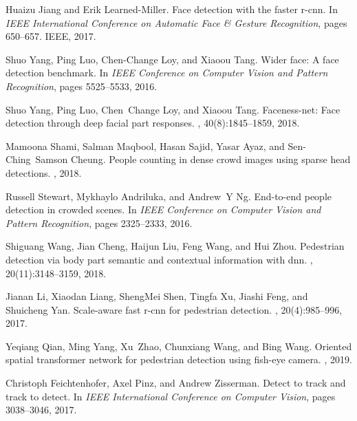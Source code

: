 \documentclass[journal]{IEEEtran}
\begin{document}
\begin{thebibliography}{10}
	
	Huaizu Jiang and Erik Learned-Miller.
	\newblock Face detection with the faster r-cnn.
	\newblock In {\em IEEE International Conference on Automatic Face \& Gesture
		Recognition}, pages 650--657. IEEE, 2017.
	
	Shuo Yang, Ping Luo, Chen-Change Loy, and Xiaoou Tang.
	\newblock Wider face: A face detection benchmark.
	\newblock In {\em IEEE Conference on Computer Vision and Pattern Recognition},
	pages 5525--5533, 2016.
	
	Shuo Yang, Ping Luo, Chen~Change Loy, and Xiaoou Tang.
	\newblock Faceness-net: Face detection through deep facial part responses.
	,
	40(8):1845--1859, 2018.
	
	Mamoona Shami, Salman Maqbool, Hasan Sajid, Yasar Ayaz, and Sen-Ching~Samson
	Cheung.
	\newblock People counting in dense crowd images using sparse head detections.
	,
	2018.
	
	Russell Stewart, Mykhaylo Andriluka, and Andrew~Y Ng.
	\newblock End-to-end people detection in crowded scenes.
	\newblock In {\em IEEE Conference on Computer Vision and Pattern Recognition},
	pages 2325--2333, 2016.
	
	Shiguang Wang, Jian Cheng, Haijun Liu, Feng Wang, and Hui Zhou.
	\newblock Pedestrian detection via body part semantic and contextual
	information with dnn.
	, 20(11):3148--3159, 2018.
	
	Jianan Li, Xiaodan Liang, ShengMei Shen, Tingfa Xu, Jiashi Feng, and Shuicheng
	Yan.
	\newblock Scale-aware fast r-cnn for pedestrian detection.
	, 20(4):985--996, 2017.
	
	Yeqiang Qian, Ming Yang, Xu~Zhao, Chunxiang Wang, and Bing Wang.
	\newblock Oriented spatial transformer network for pedestrian detection using
	fish-eye camera.
	, 2019.
	
	Christoph Feichtenhofer, Axel Pinz, and Andrew Zisserman.
	\newblock Detect to track and track to detect.
	\newblock In {\em IEEE International Conference on Computer Vision}, pages
	3038--3046, 2017.
	

\end{thebibliography}
\end{document}
